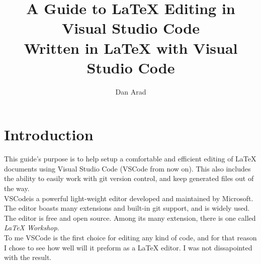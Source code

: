 \documentclass{article}
\newcommand{\latex}{\LaTeX\xspace}
\begin{document}
\title{
	A Guide to \latex Editing in Visual Studio Code\\
	\large Written in \latex with Visual Studio Code
}
\author{Dan Arad}
\maketitle

\section{Introduction}
This guide's purpose is to help setup a comfortable and efficient editing of \latex documents using Visual Studio Code (VSCode from now on). This also includes the ability to easily work with git version control, and keep generated files out of the way.\\
VSCode\footnotemark[0] is a powerful light-weight editor developed and maintained by Microsoft. The editor boasts many extensions and built-in git support, and is widely used. The editor is free and open source. Among its many extension, there is one called \emph{LaTeX Workshop}\footnotemark[1].\\
To me VSCode is the first choice for editing any kind of code, and for that reason I chose to see how well will it preform as a \latex editor. I was not dissapointed with the result.

\end{document}
